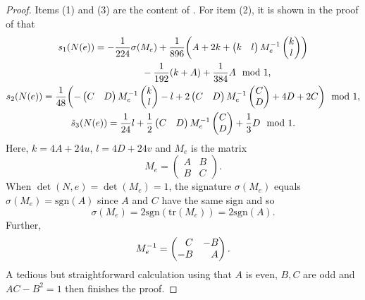\documentclass[pdftex]{sigma}
\numberwithin{equation}{section}
\theoremstyle{definition}
\numberwithin{table}{section}
\begin{document}
\begin{proof}
	Items (1) and (3) are the content of \cite[Lemma~3]{Xu25}. For item (2), it is shown in the proof of \cite[Lemma~3]{Xu25} that
	\begin{gather*}
		s_1(N(e))= -\frac{1}{224}\sigma(M_e)+\frac{1}{896}\biggl(A+2k+\begin{pmatrix}
			k & l
		\end{pmatrix}M_e^{-1}\begin{pmatrix}
			k \\ l
		\end{pmatrix}\biggr)\\
		\hphantom{s_1(N(e))=}{} -\frac{1}{192}(k+A)+\frac{1}{384}A\mod 1,\\
		s_2(N(e))= \frac{1}{48}\biggl(-\begin{pmatrix}
			C & D
		\end{pmatrix}M_e^{-1}\begin{pmatrix}
			k\\l
		\end{pmatrix}-l+2\begin{pmatrix}
			C & D
		\end{pmatrix}M_e^{-1}\begin{pmatrix}
			C\\D
		\end{pmatrix}+4D+2C \biggr)\mod 1,\\
		\tilde{s}_3(N(e))= \frac{1}{24}l+\frac{1}{2}\begin{pmatrix}
			C & D
		\end{pmatrix}M_e^{-1}\begin{pmatrix}
			C\\D
		\end{pmatrix}+\frac{1}{3}D\mod 1.
	\end{gather*}
	Here, $k=4A+24u$, $l=4D+24v$ and $M_e$ is the matrix
	\[ M_e=\begin{pmatrix}
		A & B\\B & C
	\end{pmatrix}. \]
	When $\det(N,e)=\det(M_e)=1$, the signature $\sigma(M_e)$ equals $\sigma(M_e)=\mathrm{sgn}(A)$ since $A$ and $C$ have the same sign and so
	\[ \sigma(M_e)=2\mathrm{sgn}(\mathrm{tr}(M_e))=2\mathrm{sgn}(A). \]
	Further,
	\[ M_e^{-1}=\begin{pmatrix}
		\hphantom{-}C & -B\\-B& \hphantom{-}A\end{pmatrix}. \]
	A tedious but straightforward calculation using that $A$ is even, $B,C$ are odd and $AC-B^2=1$ then finishes the proof.
\end{proof}	
\end{document}
